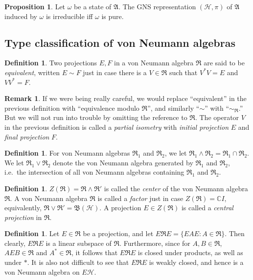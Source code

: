 \documentclass[12pt]{article}
\newcommand{\alg}[1]{\mathfrak{#1}}
\newcommand{\bh}{\mathfrak{B}(\mathcal{H})}
\theoremstyle{definition}
\newtheorem{prop}[thm]{Proposition}
\theoremstyle{definition}
\newtheorem{defn}[thm]{Definition}
\newtheorem{note}[thm]{Remark}
\theoremstyle{remark}
\def\2#1{{\mathcal #1}}
\def\7#1{{\mathbb #1}}
\def\al#1{{\mathfrak #1}}
\def\om{\omega} \def\Om{\Omega} \def\dd{\partial} \def\D{\Delta}
\begin{document}
\begin{prop} Let $\om$ be a state of $\alg{A}$. The GNS representation
  $(\2H ,\pi )$ of $\alg{A}$ induced by $\om$ is irreducible iff $\om$
  is pure.  \label{pure-irred}
\end{prop}

\bigskip {}


\subsection{Type classification of von Neumann algebras}

\begin{defn} Two projections $E,F$ in a von Neumann algebra $\alg{R}$ are said to be
  \emph{equivalent}, written $E\sim F$ just in case there is a $V\in \alg{R}$ such
  that $V^*V=E$ and $VV^*=F$.  \end{defn}

\begin{note} If we were being really careful, we would replace ``equivalent'' in the
  previous definition with ``equivalence modulo $\alg{R}$'', and similarly ``$\sim$''
  with ``$\sim _{\alg{R}}$.''  But we will not run into trouble by omitting the
  reference to $\alg{R}$.  The operator $V$ in the previous definition is called a
  \emph{partial isometry} with \emph{initial projection} $E$ and \emph{final
    projection} $F$. \end{note}

\begin{defn} For von Neumann algebras $\al R_1$ and
  $\al R_2$, we let $\al R_1\wedge \al R_2=\al R_1\cap
  \al R_2$.  We let $\al R_1\vee \al R_2$ denote the
  von Neumann algebra generated by $\al R_1$ and $\al
  R_2$, i.e.\ the intersection of all von Neumann
  algebras containing $\al R_1$ and $\al
  R_2$.  \end{defn}

\begin{defn} $Z(\al R)=\al R\wedge \al R'$ is called
  the \emph{center} of the von Neumann algebra $\al R$.
  A von Neumann algebra $\al R$ is called a
  \emph{factor} just in case $Z(\al R)=\7C I$,
  equivalently, $\al R\vee \al R'=\bh$.  A projection
  $E\in Z(\al R)$ is called a \emph{central projection}
  in $\al R$.
\end{defn}

\begin{defn} Let $E\in \alg{R}$ be a projection, and
  let $E\alg{R}E=\{ EAE:A\in \alg{R}\}$.  Then clearly,
  $E\alg{R}E$ is a linear subspace of $\alg{R}$.
  Furthermore, since for $A,B\in \alg{R}$, $AEB\in
  \alg{R}$ and $A^*\in \alg{R}$, it follows that
  $E\alg{R}E$ is closed under products, as well as
  under $*$.  It is also not difficult to see that
  $E\alg{R}E$ is weakly closed, and hence is a von
  Neumann algebra on $E\2H$.
\end{defn}
\end{document}
